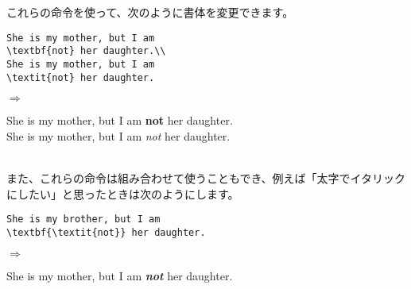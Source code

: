 これらの命令を使って、次のように書体を変更できます。\\
\begin{minipage}[c]{.50\textwidth}
\begin{screen}
\small
\begin{verbatim}
She is my mother, but I am
\textbf{not} her daughter.\\
She is my mother, but I am
\textit{not} her daughter.
\end{verbatim}
\end{screen}
\end{minipage}%
$\Rightarrow$
\begin{minipage}{.45\textwidth}
\begin{shadebox}
She is my mother, but I am
\textbf{not} her daughter.\\
She is my mother, but I am
\textit{not} her daughter.
\end{shadebox}
\end{minipage}
\vspace*{1mm}\\
また、これらの命令は組み合わせて使うこともでき、例えば「太字でイタリック
にしたい」と思ったときは次のようにします。\\
\begin{minipage}[c]{.50\textwidth}
\begin{screen}
\small
\begin{verbatim}
She is my brother, but I am
\textbf{\textit{not}} her daughter.
\end{verbatim}
\end{screen}
\end{minipage}%
$\Rightarrow$
\begin{minipage}{.45\textwidth}
\begin{shadebox}
She is my mother, but I am
\textbf{\textit{not}} her daughter.
\end{shadebox}
\end{minipage}
\vspace*{1mm}\\
